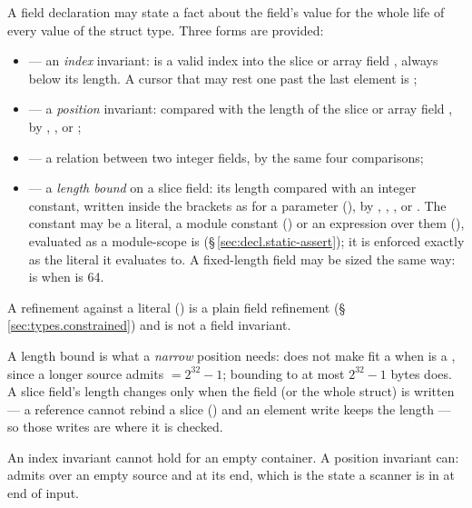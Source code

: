 \pnum
A field declaration may state a fact about the field's value for the whole life of every value
of the struct type. Three forms are provided:
\begin{itemize}
  \item {} --- an \emph{index} invariant:  is a valid index
        into the slice or array field , always below its length.  A cursor that may rest
        one past the last element is ;
  \item {} --- a \emph{position} invariant:  compared with the
        length of the slice or array field , by \lain{<}, \lain{<=}, \lain{>} or
        \lain{>=};
  \item {} --- a relation between two integer fields, by the same four
        comparisons;
  \item {} --- a \emph{length bound} on a slice field: its length
        compared with an integer constant, written inside the brackets as for a parameter
        (), by \lain{<}, \lain{<=}, \lain{>}, \lain{>=} or \lain{==}. The
        constant may be a literal, a module constant () or an
        expression over them (), evaluated as a module-scope
         is (\S\,\ref{sec:decl.static-assert}); it is enforced exactly as the
        literal it evaluates to. A fixed-length field may be sized the same way:
         is  when  is 64.
\end{itemize}
A refinement against a literal () is a plain field refinement
(\S\,\ref{sec:types.constrained}) and is not a field invariant.

\pnum
A length bound is what a \emph{narrow} position needs:  does not make
 fit a  when  is a , since a longer source admits
 \(= 2^{32}-1\); bounding  to at most \(2^{32}-1\) bytes does. A slice field's
length changes only when the field (or the whole struct) is written --- a  reference
cannot rebind a slice () and an element write keeps the length --- so those writes
are where it is checked.

\pnum
An index invariant cannot hold for an empty container. A position invariant can:
 admits  over an empty source and
 at its end, which is the state a scanner is in at end of input.

